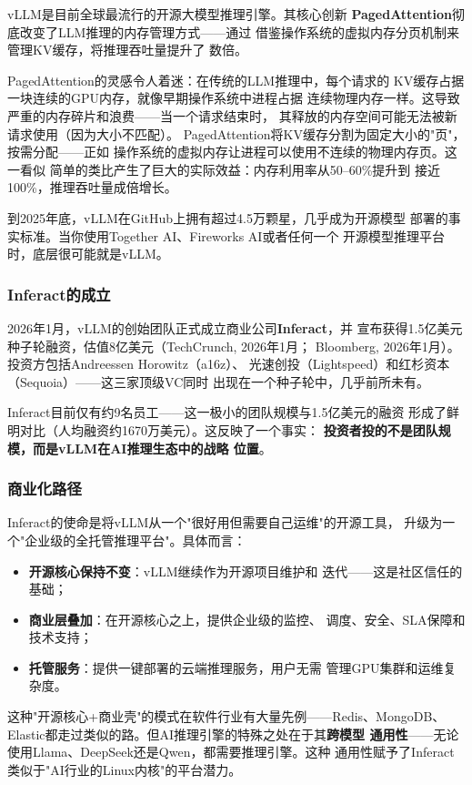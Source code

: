 vLLM是目前全球最流行的开源大模型推理引擎。其核心创新
\textbf{PagedAttention}彻底改变了LLM推理的内存管理方式——通过
借鉴操作系统的虚拟内存分页机制来管理KV缓存，将推理吞吐量提升了
数倍。

PagedAttention的灵感令人着迷：在传统的LLM推理中，每个请求的
KV缓存占据一块连续的GPU内存，就像早期操作系统中进程占据
连续物理内存一样。这导致严重的内存碎片和浪费——当一个请求结束时，
其释放的内存空间可能无法被新请求使用（因为大小不匹配）。
PagedAttention将KV缓存分割为固定大小的"页"，按需分配——正如
操作系统的虚拟内存让进程可以使用不连续的物理内存页。这一看似
简单的类比产生了巨大的实际效益：内存利用率从50--60\%提升到
接近100\%，推理吞吐量成倍增长。

到2025年底，vLLM在GitHub上拥有超过4.5万颗星，几乎成为开源模型
部署的事实标准。当你使用Together AI、Fireworks AI或者任何一个
开源模型推理平台时，底层很可能就是vLLM。

\subsubsection{Inferact的成立}
2026年1月，vLLM的创始团队正式成立商业公司\textbf{Inferact}，并
宣布获得1.5亿美元种子轮融资，估值8亿美元（TechCrunch, 2026年1月；
Bloomberg, 2026年1月）。投资方包括Andreessen Horowitz（a16z）、
光速创投（Lightspeed）和红杉资本（Sequoia）——这三家顶级VC同时
出现在一个种子轮中，几乎前所未有。

Inferact目前仅有约9名员工——这一极小的团队规模与1.5亿美元的融资
形成了鲜明对比（人均融资约1670万美元）。这反映了一个事实：
\textbf{投资者投的不是团队规模，而是vLLM在AI推理生态中的战略
位置}。

\subsubsection{商业化路径}
Inferact的使命是将vLLM从一个"很好用但需要自己运维"的开源工具，
升级为一个"企业级的全托管推理平台"。具体而言：
\begin{itemize}
  \item \textbf{开源核心保持不变}：vLLM继续作为开源项目维护和
    迭代——这是社区信任的基础；
  \item \textbf{商业层叠加}：在开源核心之上，提供企业级的监控、
    调度、安全、SLA保障和技术支持；
  \item \textbf{托管服务}：提供一键部署的云端推理服务，用户无需
    管理GPU集群和运维复杂度。
\end{itemize}

这种"开源核心+商业壳"的模式在软件行业有大量先例——Redis、MongoDB、
Elastic都走过类似的路。但AI推理引擎的特殊之处在于其\textbf{跨模型
通用性}——无论使用Llama、DeepSeek还是Qwen，都需要推理引擎。这种
通用性赋予了Inferact类似于"AI行业的Linux内核"的平台潜力。

